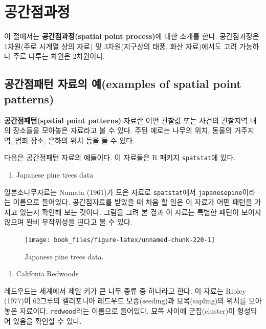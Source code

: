 \documentclass[b5paper,]{scrbook}
\providecommand{\tightlist}{%
  \setlength{\itemsep}{0pt}\setlength{\parskip}{0pt}}
\theoremstyle{plain}
\theoremstyle{definition}
\numberwithin{equation}{section}
\begin{document}
\chapter{공간점과정}\label{pointpattern}

이 절에서는 \textbf{공간점과정(spatial point process)}에 대한 소개를
한다. 공간점과정은 1차원(주로 시계열 상의 자료) 및 3차원(지구상의 태풍,
화산 자료)에서도 고려 가능하나 주로 다루는 차원은 2차원이다.

\section{공간점패턴 자료의 예(examples of spatial point
patterns)}\label{--examples-of-spatial-point-patterns}

\textbf{공간점패턴(spatial point patterns)} 자료란 어떤 관찰값 또는
사건의 관찰지역 내의 장소들을 모아놓은 자료라고 볼 수 있다. 주된 예로는
나무의 위치, 동물의 거주지역, 범죄 장소, 은하의 위치 등을 들 수 있다.

다음은 공간점패턴 자료의 예들이다. 이 자료들은 R 패키지
\texttt{spatstat}에 있다.

\begin{enumerate}
\def\labelenumi{\arabic{enumi}.}
\tightlist
\item
  Japanese pine trees data
\end{enumerate}

일본소나무자료는 Numata (1961)가 모은 자료로 \texttt{spatstat}에서
\texttt{japanesepine}이라는 이름으로 들어있다. 공간점자료를 받았을 때
처음 할 일은 이 자료가 어떤 패턴을 가지고 있는지 확인해 보는 것이다.
그림을 그려 본 결과 이 자료는 특별한 패턴이 보이지 않으며 완비
무작위성을 띤다고 볼 수 있다.

\begin{figure}

{\centering \texttt{[image: book\_files/figure-latex/unnamed-chunk-220-1]} 

}

\caption{Japanese pine trees data.}\label{fig:unnamed-chunk-220}
\end{figure}

\begin{enumerate}
\def\labelenumi{\arabic{enumi}.}
\setcounter{enumi}{1}
\tightlist
\item
  Califonia Redwoods
\end{enumerate}

레드우드는 세계에서 제일 키가 큰 나무 종류 중 하나라고 한다. 이 자료는
Ripley (1977)이 62그루의 캘리포니아 레드우드 모종(seeding)과
묘목(sapling)의 위치를 모아놓은 자료이다. \texttt{redwood}라는 이름으로
들어있다. 묘목 사이에 군집(cluster)이 형성되어 있음을 확인할 수 있다.
\end{document}

